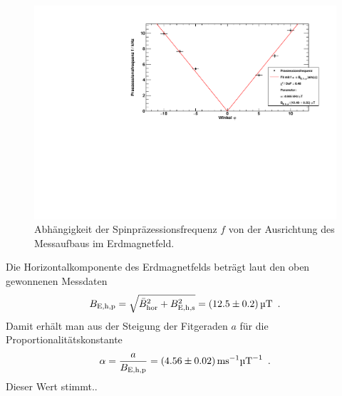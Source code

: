 \begin{figure}[H]
\begin{center}
  \includegraphics[width=\textwidth]{../img/part4/winkel.pdf}
  \caption{Abhängigkeit der Spinpräzessionsfrequenz $f$ von der Ausrichtung des Messaufbaus im Erdmagnetfeld.}
  \label{img:spp:Winkelabhängigkeit}
\end{center}
\end{figure} 

Die Horizontalkomponente des Erdmagnetfelds beträgt laut den oben gewonnenen Messdaten
\begin{equation}
  B_\text{E,h,p} = \sqrt{\bar{B}_\text{hor}^2+B_\text{E,h,s}^2}=(12.5 \pm 0.2)\,\text{\textmu T} \ \, .
\end{equation}
Damit erhält man aus der Steigung der Fitgeraden $a$ für die Proportionalitätskonstante
\begin{equation}
  \alpha = \frac{a}{B_\text{E,h,p}} = (4.56\pm0.02)\,\text{ms}^{-1} \text{\textmu T}^{-1} \ \, .
\end{equation}
Dieser Wert stimmt..
